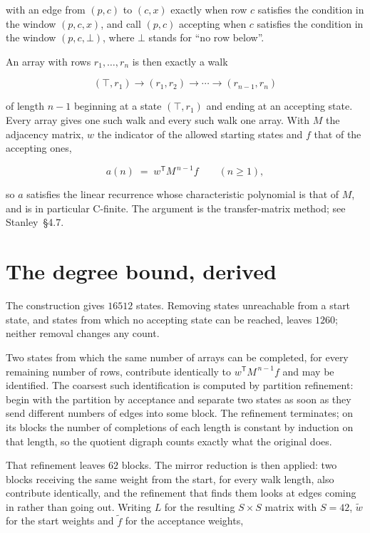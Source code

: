 \documentclass[11pt]{article}
\theoremstyle{definition}
\begin{document}
with an edge from $(p,c)$ to $(c,x)$ exactly when row $c$ satisfies the condition in the window $(p,c,x)$, and call $(p,c)$ accepting when $c$ satisfies the condition in the window $(p,c,\bot)$, where $\bot$ stands for ``no row below''.

An array with rows $r_1,\dots,r_n$ is then exactly a walk

\[(\top,r_1) \to (r_1,r_2) \to \cdots \to (r_{n-1},r_n)\]

of length $n-1$ beginning at a state $(\top,r_1)$ and ending at an accepting state. Every array gives one such walk and every such walk one array. With $M$ the adjacency matrix, $w$ the indicator of the allowed starting states and $f$ that of the accepting ones,

\[a(n) \;=\; w^{\mathsf T} M^{\,n-1} f \qquad (n \ge 1),\]

so $a$ satisfies the linear recurrence whose characteristic polynomial is that of $M$, and is in particular C-finite. The argument is the transfer-matrix method; see Stanley~\S4.7.

\section{The degree bound, derived}

The construction gives $16512$ states. Removing states unreachable from a start state, and states from which no accepting state can be reached, leaves $1260$; neither removal changes any count.

Two states from which the same number of arrays can be completed, for every remaining number of rows, contribute identically to $w^{\mathsf T}M^{\,n-1}f$ and may be identified. The coarsest such identification is computed by partition refinement: begin with the partition by acceptance and separate two states as soon as they send different numbers of edges into some block. The refinement terminates; on its blocks the number of completions of each length is constant by induction on that length, so the quotient digraph counts exactly what the original does.

That refinement leaves $62$ blocks. The mirror reduction is then applied: two blocks receiving the same weight from the start, for every walk length, also contribute identically, and the refinement that finds them looks at edges coming in rather than going out. Writing $L$ for the resulting $S \times S$ matrix with $S = 42$, $\tilde w$ for the start weights and $\tilde f$ for the acceptance weights,
\end{document}
